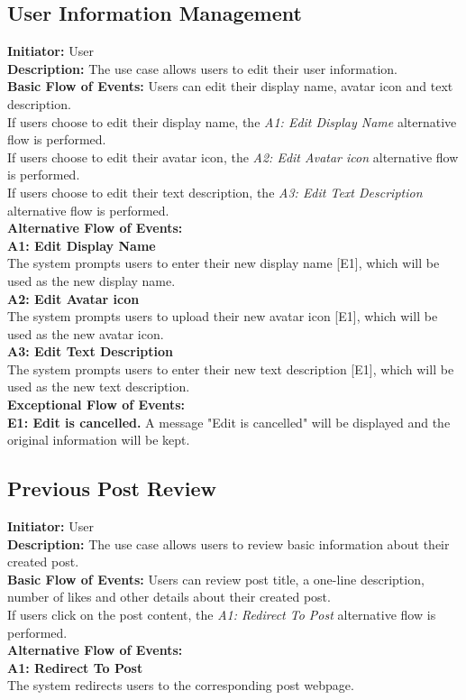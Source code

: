\documentclass[a4paper,11pt]{scrreprt}
\begin{document}
\subsection{User Information Management}
\textbf{\large Initiator: }User\\
\textbf{\large Description: }The use case allows users to edit their user information.\\
\textbf{\large Basic Flow of Events: }Users can edit their display name, avatar icon and text description.\\
If users choose to edit their display name, the \textit{A1: Edit Display Name} alternative flow is performed.\\
If users choose to edit their avatar icon, the \textit{A2: Edit Avatar icon} alternative flow is performed.\\
If users choose to edit their text description, the \textit{A3: Edit Text Description} alternative flow is performed.\\
\textbf{\large Alternative Flow of Events: }\\
\textbf{A1: Edit Display Name}\\
The system prompts users to enter their new display name [E1], which will be used as the new display name.\\
\textbf{A2: Edit Avatar icon}\\
The system prompts users to upload their new avatar icon [E1], which will be used as the new avatar icon.\\
\textbf{A3: Edit Text Description}\\
The system prompts users to enter their new text description [E1], which will be used as the new text description.\\
\textbf{\large Exceptional Flow of Events:}\\
\textbf{E1: Edit is cancelled.} A message "Edit is cancelled" will be displayed and the original information will be kept.\\

\begin{figure}[H]
    \centering
    
\end{figure}

\subsection{Previous Post Review}
\textbf{\large Initiator: }User\\
\textbf{\large Description: }The use case allows users to review basic information about their created post.\\
\textbf{\large Basic Flow of Events: }Users can review post title, a one-line description, number of likes and other details about their created post. \\
If users click on the post content, the \textit{A1: Redirect To Post} alternative flow is performed.\\
\textbf{\large Alternative Flow of Events: }\\
\textbf{A1: Redirect To Post}\\
The system redirects users to the corresponding post webpage.
\end{document}
